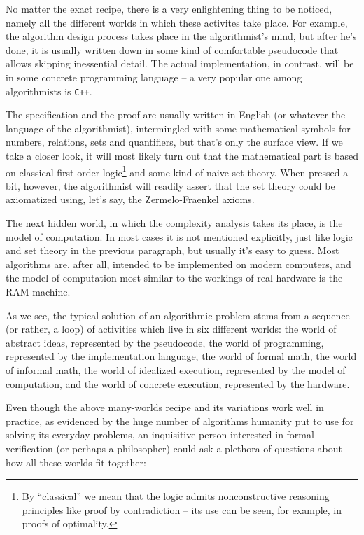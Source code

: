 \documentclass[declaration,mgr,english,shortabstract]{iithesis}
\newcommand{\m}[1]{\texttt{#1}}
\begin{document}
No matter the exact recipe, there is a very enlightening thing to be noticed, namely all the different worlds in which these activites take place. For example, the algorithm design process takes place in the algorithmist's mind, but after he's done, it is usually written down in some kind of comfortable pseudocode that allows skipping inessential detail. The actual implementation, in contrast, will be in some concrete programming language -- a very  popular one among algorithmists is \m{C++}.

The specification and the proof are usually written in English (or whatever the language of the algorithmist), intermingled with some mathematical symbols for numbers, relations, sets and quantifiers, but that's only the surface view. If we take a closer look, it will most likely turn out that the mathematical part is based on classical first-order logic\footnote{By ``classical'' we mean that the logic admits nonconstructive reasoning principles like proof by contradiction \cite{ProofByContradiction} -- its use can be seen, for example, in proofs of optimality.} and some kind of naive set theory. When pressed a bit, however, the algorithmist will readily assert that the set theory could be axiomatized using, let's say, the Zermelo-Fraenkel axioms.

The next hidden world, in which the complexity analysis takes its place, is the model of computation. In most cases it is not mentioned explicitly, just like logic and set theory in the previous paragraph, but usually it's easy to guess. Most algorithms are, after all, intended to be implemented on modern computers, and the model of computation most similar to the workings of real hardware is the RAM machine.

As we see, the typical solution of an algorithmic problem stems from a sequence (or rather, a loop) of activities which live in six different worlds: the world of abstract ideas, represented by the pseudocode, the world of programming, represented by the implementation language, the world of formal math, the world of informal math, the world of idealized execution, represented by the model of computation, and the world of concrete execution, represented by the hardware.

Even though the above many-worlds recipe and its variations work well in practice, as evidenced by the huge number of algorithms humanity put to use for solving its everyday problems, an inquisitive person interested in formal verification (or perhaps a philosopher) could ask a plethora of questions about how all these worlds fit together:
\end{document}
